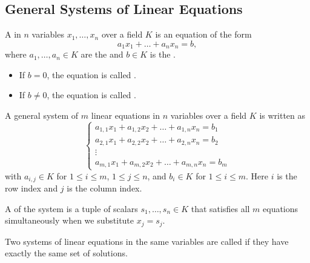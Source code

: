 \subsection{General Systems of Linear Equations}

\begin{definition}
\label{def:linear_equation}
A  in $n$ variables $x_1, \dots, x_n$ over a field $K$ is an equation of the form
\[
a_1 x_1 + \dots + a_n x_n = b,
\]
where $a_1, \dots, a_n \in K$ are the  and $b \in K$ is the .
\begin{itemize}
    \item If $b = 0$, the equation is called .
    \item If $b \ne 0$, the equation is called .
\end{itemize}
\end{definition}

\begin{definition}
\label{def:system_of_linear_equations}
A general system of $m$ linear equations in $n$ variables over a field $K$ is written as
\begin{equation} \label{eq:general_system}
\begin{cases}
a_{1,1}x_1 + a_{1,2}x_2 + \dots + a_{1,n}x_n = b_1 \\
a_{2,1}x_1 + a_{2,2}x_2 + \dots + a_{2,n}x_n = b_2 \\
\vdots \\
a_{m,1}x_1 + a_{m,2}x_2 + \dots + a_{m,n}x_n = b_m
\end{cases}
\end{equation}
with $a_{i,j} \in K$ for $1 \le i \le m$, $1 \le j \le n$, and $b_i \in K$ for $1 \le i \le m$. Here $i$ is the row index and $j$ is the column index.
\end{definition}

\begin{definition}[Solution]
\label{def:solution}
A  of the system is a tuple of scalars $s_1, \dots, s_n \in K$ that satisfies all $m$ equations simultaneously when we substitute $x_j = s_j$.
\end{definition}

\begin{definition}
\label{def:equivalent_systems}
Two systems of linear equations in the same variables are called  if they have exactly the same set of solutions.
\end{definition}

